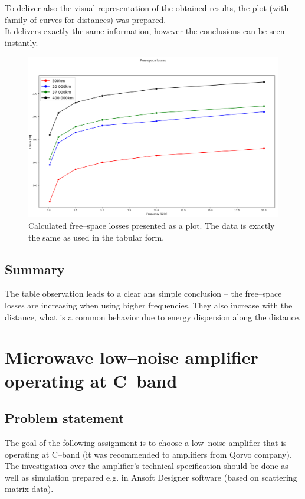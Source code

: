 \documentclass[eng,printmode]{mgr}
\begin{document}
To deliver also the visual representation of the obtained results, the plot (with family of curves for distances) was prepared.\\
It delivers exactly the same information, however the conclusions can be seen instantly.
\begin{figure}[h]
\centering
\includegraphics[width=1\linewidth]{freespaceloss}
\caption{Calculated free--space losses presented as a plot. The data is exactly the same as used in the tabular form.}
\label{fig:freespaceloss}
\end{figure}

\noindent
\section{Summary}
The table observation leads to a clear ans simple conclusion -- the free--space losses are increasing when using higher frequencies. They also increase with the distance, what is a common behavior due to energy dispersion along the distance.
\newpage
\chapter{Microwave low--noise amplifier operating at C--band}
\section{Problem statement}
The goal of the following assignment is to choose a low--noise amplifier that is operating at C--band (it was recommended to amplifiers from Qorvo company). The investigation over the amplifier's technical specification should be done as well as  simulation prepared e.g. in Ansoft Designer software (based on scattering matrix data).
\end{document}
